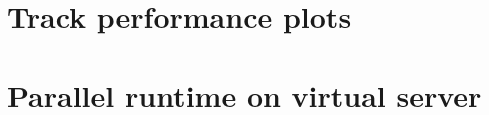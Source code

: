 
\begin{appendices}
	\section{Track performance plots}
	
	
	\section{Parallel runtime on virtual server}
	
%	

	



\end{appendices}
